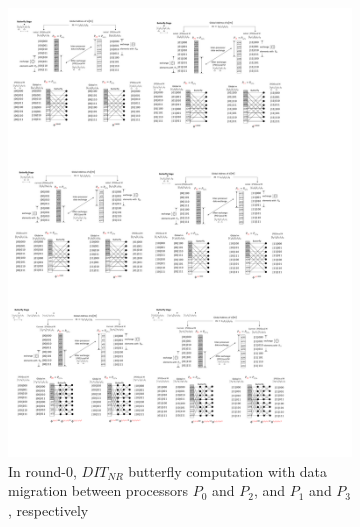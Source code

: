 \documentclass[submission]{iacrtrans}
\theoremstyle{plain}
\begin{document}
\begin{figure}[!tb]
\centering
\begin{subfigure}[b]{.95\textwidth}
\includegraphics[width=\textwidth]{./fig/DataSwapWithPerm1.pdf}
\caption{In round-0, $DIT_{NR}$ butterfly computation with data migration between processors $P_0$ and $P_2$, and $P_1$ and $P_3$, respectively}\label{fig:dataswap_with_perm1}
\end{subfigure}
\hspace{1em}
\begin{subfigure}[b]{.95\textwidth}\centering

\end{subfigure}
\end{figure}
\end{document}
